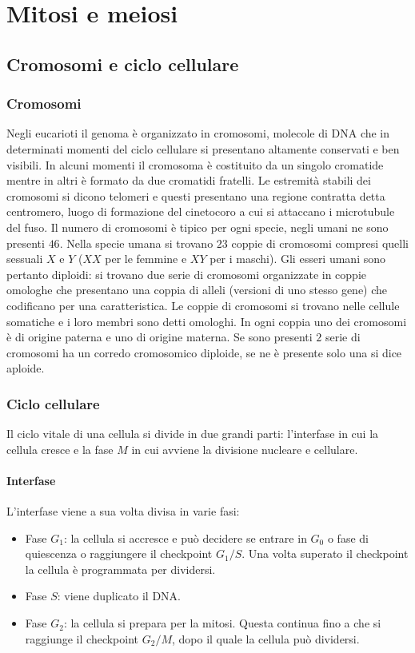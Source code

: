 \chapter{Mitosi e meiosi}
\section{Cromosomi e ciclo cellulare}
\subsection{Cromosomi}
Negli eucarioti il genoma \`e organizzato in cromosomi, molecole di DNA che in determinati momenti del ciclo cellulare si presentano altamente conservati e ben visibili. In alcuni 
momenti il cromosoma \`e costituito da un singolo cromatide mentre in altri \`e formato da due cromatidi fratelli. Le estremit\`a stabili dei cromosomi si dicono telomeri e questi 
presentano una regione contratta detta centromero, luogo di formazione del cinetocoro a cui si attaccano i microtubule del fuso. Il numero di cromosomi \`e tipico per ogni specie, negli
umani ne sono presenti $46$. Nella specie umana si trovano $23$ coppie di cromosomi compresi quelli sessuali $X$ e $Y$ ($XX$ per le femmine e $XY$ per i maschi). Gli esseri umani sono
pertanto diploidi: si trovano due serie di cromosomi organizzate in coppie omologhe che presentano una coppia di alleli (versioni di uno stesso gene) che codificano per una 
caratteristica. Le coppie di cromosomi si trovano nelle cellule somatiche e i loro membri sono detti omologhi. In ogni coppia uno dei cromosomi \`e di origine paterna e uno di origine
materna. Se sono presenti $2$ serie di cromosomi ha un corredo cromosomico diploide, se ne \`e presente solo una si dice aploide. 
\subsection{Ciclo cellulare}
Il ciclo vitale di una cellula si divide in due grandi parti: l'interfase in cui la cellula cresce e la fase $M$ in cui avviene la divisione nucleare e cellulare. 
\subsubsection{Interfase}
L'interfase viene a sua volta divisa in varie fasi: 
\begin{itemize}
	\item Fase $G_1$: la cellula si accresce e pu\`o decidere se entrare in $G_0$ o fase di quiescenza o raggiungere il checkpoint $G_1/S$. Una volta superato il checkpoint la
		cellula \`e programmata per dividersi.
	\item Fase $S$: viene duplicato il DNA.
	\item Fase $G_2$: la cellula si prepara per la mitosi. Questa continua fino a che si raggiunge il checkpoint $G_2/M$, dopo il quale la cellula pu\`o dividersi. 

\end{itemize}
